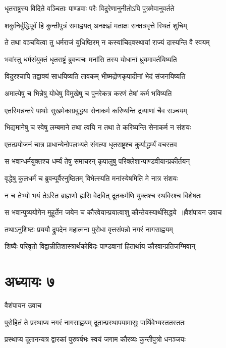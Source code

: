 \twolineshloka
{धृतराष्ट्रस्य विदिते वञ्चिताः पाण्डवाः परैः}
{विदुरेणानुनीतोऽपि पुत्रमेवानुवर्तते}


\twolineshloka
{शकुनिर्बुद्धिपूर्वं हि कुन्तीपुत्रं समाह्वयत्}
{अनक्षज्ञं मताक्षः सन्क्षत्रवृत्ते स्थितं शुचिम्}


\twolineshloka
{ते तथा वञ्चयित्वा तु धर्मराजं युधिष्ठिरम्}
{न कस्यांचिदवस्थायां राज्यं दास्यन्ति वै स्वयम्}


\twolineshloka
{भवांस्तु धर्मसंयुक्तं धृतराष्ट्रं ब्रुवन्वचः}
{मनांसि तस्य योधानां ध्रुवमावर्तयिष्यति}


\twolineshloka
{विदुरश्चापि तद्वाक्यं साधयिष्यति तावकम्}
{भीष्मद्रोणकृपादीनां भेदं संजनयिष्यति}


\twolineshloka
{अमात्येषु च भिन्नेषु योधेषु विमुखेषु च}
{पुनरेकत्र करणं तेषां कर्म भविष्यति}


\twolineshloka
{एतस्मिन्नन्तरे पार्थाः सुखमेकाग्रबुद्धयः}
{सेनाकर्म करिष्यन्ति द्रव्याणां चैव सञ्चयम्}


\twolineshloka
{भिद्यमानेषु च स्वेषु लम्बमाने तथा त्वयि}
{न तथा ते करिष्यन्ति सेनाकर्म न संशयः}


\twolineshloka
{एतत्प्रयोजनं चात्र प्राधान्येनोपलभ्यते}
{संगत्या धृतराष्ट्रश्च कुर्याद्धर्म्यं वचस्तव}


\twolineshloka
{स भवान्धर्मयुक्तश्च धर्म्यं तेषु समाचरन्}
{कृपालुषु परिक्लेशान्पाण्डवीयान्प्रकीर्तयन्}


\twolineshloka
{वृद्धेषु कुलधर्मं च ब्रुवन्पूर्वैरनुष्ठितम्}
{विभेत्स्यति मनांस्येषमिति मे नात्र संशयः}


\twolineshloka
{न च तेभ्यो भयं तेऽस्ति ब्राह्मणो ह्यसि वेदवित्}
{दूतकर्मणि युक्तश्च स्थविरश्च विशेषतः}


\threelineshloka
{स भवान्पुष्ययोगेन मुहूर्तेन जयेन च}
{कौरवेयान्प्रयात्वाशु कौन्तेयस्यार्थसिद्धये ॥वैशंपायन उवाच}
{}


\twolineshloka
{तथाऽनुशिष्टः प्रययौ द्रुपदेन महात्मना}
{पुरोधा वृत्तसंपन्नो नगरं नागसाह्वयम्}


\twolineshloka
{शिष्यैः परिवृतो विद्वान्नीतिशास्त्रार्थकोविदः}
{पाण्डवानां हितार्थाय कौरवान्प्रतिजग्मिवान्}


\chapter{अध्यायः ७}
\twolineshloka
{वैशंपायन उवाच}
{}


\twolineshloka
{पुरोहितं ते प्रस्थाप्य नगरं नागसाह्वयम्}
{दूतान्प्रस्थापयामासुः पार्थिवेभ्यस्ततस्ततः}


\twolineshloka
{प्रस्थाप्य दूतानन्यत्र द्वारकां पुरुषर्षभः}
{स्वयं जगाम कौरव्यः कुन्तीपुत्रो धनञ्जयः}


